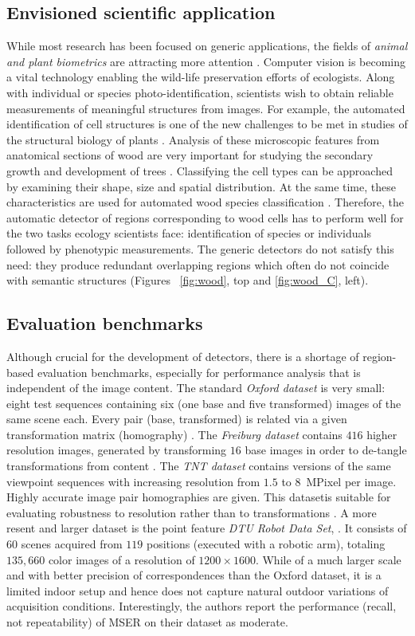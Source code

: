 \documentclass[conference,compsoc]{IEEEtran}
\begin{document}
\subsection{Envisioned scientific application}
While most research has been focused on generic applications, the
 fields of {\em animal and plant biometrics} are attracting more attention \cite{Kuehl2013, leafsnap_eccv2012}. Computer vision is becoming a vital technology enabling the wild-life preservation efforts of ecologists. Along with individual or species photo-identification, scientists wish to obtain reliable measurements of meaningful structures from images. For example, the automated identification of cell structures is one of the new challenges to be met in studies of the structural biology of plants \cite{Quelhas2011}. Analysis of these microscopic features from anatomical sections of wood are very important for studying the secondary growth and development of trees \cite{Brunel2014}. Classifying the cell types can be approached by examining their shape, size and spatial distribution. At the same time, these characteristics are used for automated wood species classification \cite{Gasson2011}. Therefore, the  automatic detector of regions corresponding to wood cells has to perform well for the two tasks ecology scientists face: identification of species or individuals followed by phenotypic measurements. The generic detectors do not satisfy this need: they produce redundant overlapping regions which often do not coincide with semantic structures (Figures ~\ref{fig:wood}, top and \ref{fig:wood_C}, left).

\subsection{Evaluation benchmarks}
Although crucial for the development of detectors, there is a shortage of region-based evaluation benchmarks, especially for performance analysis that is independent of the image content.  The standard {\em Oxford dataset} is very small: eight test sequences containing six (one base and five transformed) images of the same scene each. Every pair (base, transformed) is related via a given transformation matrix (homography) \cite{Mikolajczyk:2005}.  The {\em Freiburg dataset} contains $416$ higher resolution images, generated by transforming $16$ base images in order to de-tangle transformations from content \cite{FischerDB14}.  
The {\em TNT dataset} contains versions of the same viewpoint sequences with increasing resolution from $1.5$ to $8$~MPixel per image. Highly accurate image pair homographies are given. This datasetis suitable for evaluating robustness to resolution rather than to transformations \cite{CorRos2013}.  A more resent and larger dataset is the point feature {\em DTU Robot Data Set}, \cite{AanaesDP12}. It  consists of $60$ scenes acquired from $119$ positions (executed with a robotic arm), totaling $135, 660$ color images of a resolution of $1200 \times 1600$. While of a much larger scale and with better precision of correspondences than the Oxford dataset, it is a limited indoor setup and hence does not capture natural outdoor variations of acquisition conditions. Interestingly, the authors report the performance (recall, not repeatability) of MSER on their dataset as moderate. 
\end{document}
